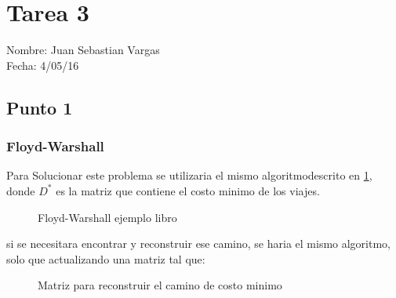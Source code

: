 \documentclass{article}
\begin{document}
\section*{Tarea 3}
Nombre: Juan Sebastian Vargas\\
Fecha: 4/05/16

\subsection*{Punto 1}
\subsubsection*{Floyd-Warshall}
Para Solucionar este problema se utilizaria el mismo algoritmodescrito en \ref{FW}, donde $D^*$ es la matriz que contiene el costo minimo de los viajes. 

\begin{figure}[H]
\begin{center}
 \caption{Floyd-Warshall ejemplo libro}
 \label{FW}
 \end{center}
\end{figure}
si se necesitara encontrar y reconstruir ese camino, se haria el mismo algoritmo, solo que actualizando una matriz tal que:

\begin{figure}[H]
\begin{center}
 \caption{Matriz para reconstruir el camino de costo minimo}
 \label{intmd}
 \end{center}
\end{figure}
 
\end{document}
